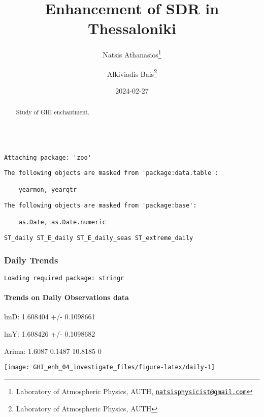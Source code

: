 \documentclass[
  10pt,
  a4paper,oneside]{article}
\title{Enhancement of SDR in Thessaloniki}
\author{Natsis Athanasios\footnote{Laboratory of Atmospheric Physics, AUTH, \href{mailto:natsisphysicist@gmail.com}{\nolinkurl{natsisphysicist@gmail.com}}} \and Alkiviadis Bais\footnote{Laboratory of Atmospheric Physics, AUTH}}
\date{2024-02-27}
\begin{document}
\maketitle
\begin{abstract}
Study of GHI enchantment.
\end{abstract}

{
\hypersetup{linkcolor=}
\setcounter{tocdepth}{4}
\tableofcontents
}
\begin{verbatim}

Attaching package: 'zoo'
\end{verbatim}

\begin{verbatim}
The following objects are masked from 'package:data.table':

    yearmon, yearqtr
\end{verbatim}

\begin{verbatim}
The following objects are masked from 'package:base':

    as.Date, as.Date.numeric
\end{verbatim}

\begin{verbatim}
ST_daily ST_E_daily ST_E_daily_seas ST_extreme_daily
\end{verbatim}

\newpage
\FloatBarrier

\hypertarget{daily-trends}{%
\subsubsection{Daily Trends}\label{daily-trends}}

\newpage

\begin{verbatim}
Loading required package: stringr
\end{verbatim}

\hypertarget{trends-on-daily-observations-data}{%
\paragraph{Trends on Daily Observations data}\label{trends-on-daily-observations-data}}

lmD: 1.608404 +/- 0.1098661

lmY: 1.608426 +/- 0.1098682

Arima: 1.6087 0.1487 10.8185 0

\begin{center}\texttt{[image: GHI\_enh\_04\_investigate\_files/figure-latex/daily-1]} \end{center}
\end{document}
